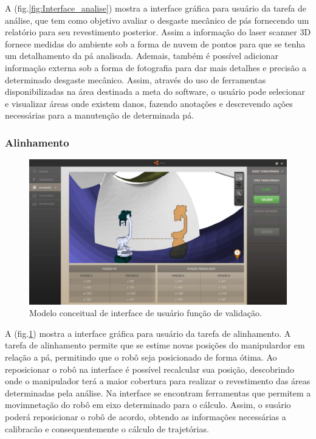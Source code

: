 \documentclass[12pt,a4paper]{article}
\begin{document}
A (fig.\ref{fig:Interface_analise}) mostra a interface gráfica para usuário da
tarefa de análise, que tem como objetivo avaliar o desgaste mecânico de pás
fornecendo um relatório para seu revestimento posterior. Assim a informação do laser scanner 3D
fornece medidas do ambiente sob a forma de nuvem de pontos para que se tenha um
detalhamento da pá analisada. Ademais, também é possível adicionar informação
externa sob a forma de fotografia para dar mais detalhes e precisão a
determinado desgaste mecânico.
Assim, através do uso de ferramentas disponibilizadas na área destinada a meta
do software, o usuário pode selecionar e visualizar áreas onde existem
danos, fazendo anotações e descrevendo ações necessárias para a manutenção de
determinada pá.

\subsubsection {Alinhamento}

\begin{figure}[H]
\begin{center}
  \includegraphics[width=.95\columnwidth]{figs/Validacao.jpg}
  \caption{Modelo conceitual de interface de usuário função de validação.}
  \label{fig:Interface_validacao}
\end{center}
\end{figure} 

A (fig.\ref{fig:Interface_validacao}) mostra a interface gráfica para usuário
da tarefa de alinhamento. A tarefa de alinhamento permite que se estime novas
posições do manipulardor em relação a pá, permitindo que o robô
seja posicionado de forma ótima. Ao reposicionar o robô na interface é possível
recalcular sua posição, descobrindo onde o manipulador terá a maior cobertura
para realizar o revestimento das áreas determinadas pela análise.
Na interface se encontram ferramentas que permitem a movimnetação do robô em
eixo determinado para o cálculo. Assim, o susário poderá reposicionar o robô de
acordo, obtendo as informações necessárias a calibracão e consequentemente o
cálculo de trajetórias.
\end{document}
